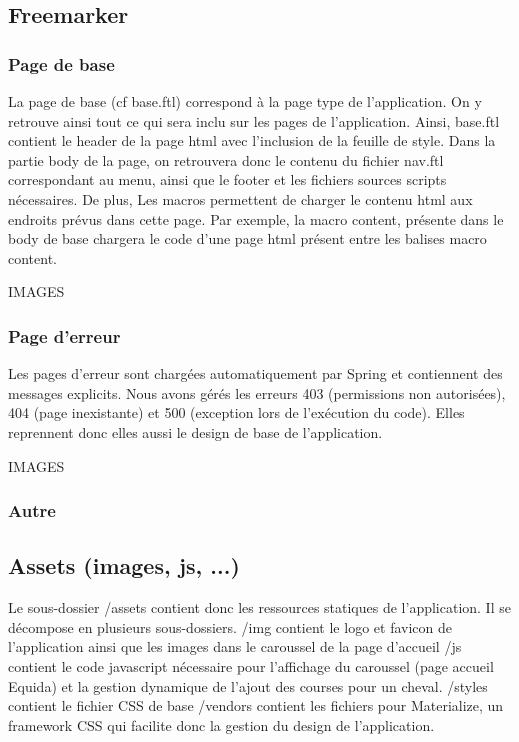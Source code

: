 		\subsection{Freemarker}

			\subsubsection{Page de base}

					La page de base (cf base.ftl) correspond à la page type de l'application. On y retrouve ainsi tout ce qui sera inclu sur les pages de l'application. Ainsi, base.ftl contient le header de la page html avec l'inclusion de la feuille de style. Dans la partie body de la page, on retrouvera donc le contenu du fichier nav.ftl correspondant au menu, ainsi que le footer et les fichiers sources scripts nécessaires. De plus,
					Les macros permettent de charger le contenu html aux endroits prévus dans cette page. Par exemple, la macro content, présente dans le body de base chargera le code d'une page html présent entre les balises macro content.

					IMAGES

			\subsubsection{Page d'erreur}

					Les pages d'erreur sont chargées automatiquement par Spring et contiennent des messages explicits. Nous avons gérés les erreurs 403 (permissions non autorisées), 404 (page inexistante) et 500 (exception lors de l'exécution du code). Elles reprennent donc elles aussi le design de base de l'application.

					IMAGES

			\subsubsection{Autre}


		\subsection{Assets (images, js, ...)}

				Le sous-dossier /assets contient donc les ressources statiques de l'application. Il se décompose en plusieurs sous-dossiers.
				/img contient le logo et favicon de l'application ainsi que les images dans le caroussel de la page d'accueil
				/js contient le code javascript nécessaire pour l'affichage du caroussel (page accueil Equida) et la gestion dynamique de l'ajout des courses pour un cheval.
				/styles contient le fichier CSS de base
				/vendors contient les fichiers pour Materialize, un framework CSS qui facilite donc la gestion du design de l'application.

